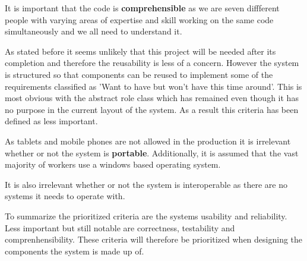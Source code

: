 It is important that the code is \textbf{comprehensible} as we are seven diffferent people with varying areas of expertise and skill working on the same code simultaneously and we all need to understand it.

As stated before it seems unlikely that this project will be needed after its completion and therefore the reusability is less of a concern. However the system is structured so that components can be reused to implement some of the requirements classified as 'Want to have but won't have this time around'. This is most obvious with the abstract role class which has remained even though it has no purpose in the current layout of the system. As a result this criteria has been defined as less important.

As tablets and mobile phones are not allowed in the production it is irrelevant whether or not the system is \textbf{portable}. Additionally, it is assumed that the vast majority of workers use a windows based operating system.

It is also irrelevant whether or not the system is interoperable as there are no systems it needs to operate with.

To summarize the prioritized criteria are the systems usability and reliability. Less important but still notable are correctness, testability and comprenhensibility. These criteria will therefore be prioritized when designing the components the system is made up of. 